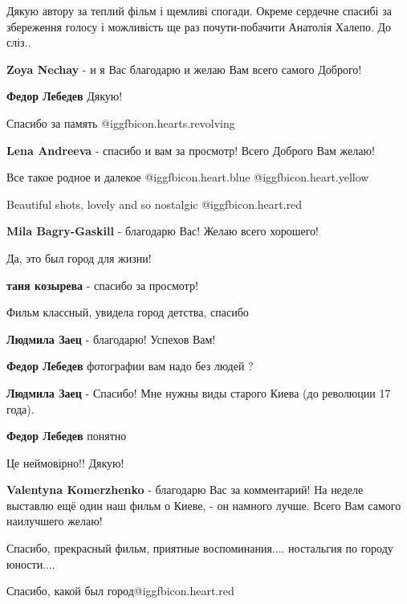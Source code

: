 \begin{itemize}

Дякую автору за теплий фільм і щемливі спогади. Окреме сердечне спасибі за
збереження голосу і можливість ще раз почути-побачити Анатолія Халепо. До
сліз..

\textbf{Zoya Nechay} - и я Вас благодарю и желаю Вам всего самого Доброго!

\textbf{Федор Лебедев} Дякую!

Спасибо за память @igg{fbicon.hearts.revolving} 

\textbf{Lena Andreeva} - спасибо и вам за просмотр! Всего Доброго Вам желаю!

Все такое родное и далекое @igg{fbicon.heart.blue}  @igg{fbicon.heart.yellow} 

Beautiful shots, lovely and so nostalgic @igg{fbicon.heart.red}

\textbf{Mila Bagry-Gaskill} - благодарю Вас! Желаю всего хорошего!

Да, это был город для жизни!

\textbf{таня козырева} - спасибо за просмотр!

Фильм классный, увидела город детства, спасибо

\begin{itemize} %
\textbf{Людмила Заец} - благодарю! Успехов Вам!

\textbf{Федор Лебедев} фотографии вам надо без людей ?

\textbf{Людмила Заец} - Спасибо! Мне нужны виды старого Киева (до революции 17 года).

\textbf{Федор Лебедев} понятно
\end{itemize} %

Це неймовірно!! Дякую!

\textbf{Valentyna Komerzhenko} - благодарю Вас за комментарий! На неделе выставлю ещё один наш фильм о Киеве, - он намного лучше. Всего Вам самого наилучшего желаю!

Спасибо, прекрасный фильм, приятные воспоминания.... ностальгия по городу юности....

Спасибо, какой был город@igg{fbicon.heart.red}


\end{itemize}
